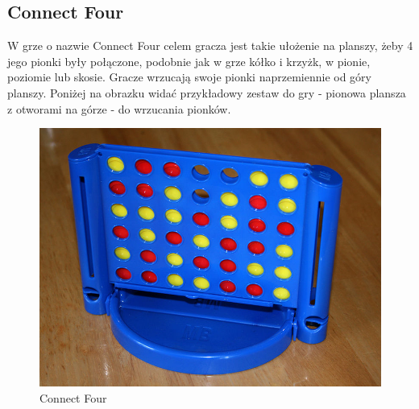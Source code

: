\documentclass[declaration,shortabstract,inz]{iithesis}
\begin{document}
\subsection{Connect Four}
W grze o nazwie Connect Four celem gracza jest takie ułożenie na planszy, żeby 4 jego pionki były połączone, podobnie jak w grze kółko i krzyżk, w pionie, poziomie lub skosie.
Gracze wrzucają swoje pionki naprzemiennie od góry planszy. Poniżej na obrazku widać przykładowy zestaw do gry - pionowa plansza z otworami na górze - do wrzucania pionków.
\begin{figure}[H]
  \includegraphics[scale=0.25]{./images/connect4.jpg}
  \centering
  \caption{Connect Four}
  \label{fig:c4}
\end{figure}
\end{document}

